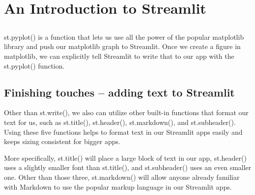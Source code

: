 \chapter{An Introduction to Streamlit\label{ch01}}
\section{}
st.pyplot() is a function that lets us use all the power of the popular matplotlib library and push our matplotlib graph to Streamlit. Once we create a figure in matplotlib, we can explicitly tell Streamlit to write that to our app with the st.pyplot() function.
\section{Finishing touches – adding text to Streamlit}
Other than st.write(), we also can utilize other built-in functions that format our text for us, such as st.title(), st.header(), st.markdown(), and st.subheader(). Using these five functions helps to format text in our Streamlit apps easily and keeps sizing consistent for bigger apps.

More specifically, st.title() will place a large block of text in our app, st.header() uses a slightly smaller font than st.title(), and st.subheader() uses an even smaller one. Other than those three, st.markdown() will allow anyone already familiar with Markdown to use the popular markup language in our Streamlit apps.
